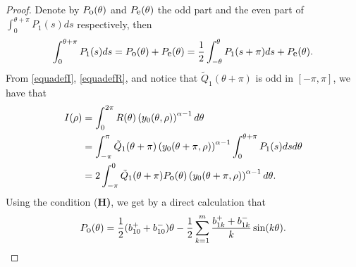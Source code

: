 \documentclass[11pt]{amsart}
\theoremstyle{remark}
\theoremstyle{definition}
\begin{document}
\begin{proof}
Denote by $P_{\mbox{\small{o}}}(\theta)$ and $P_{\mbox{\small{e}}}(\theta)$
  the odd part and the even part  of $\int_{0}^{\theta+\pi}P_1(s)ds$ respectively, then
   \begin{equation*} \int_{0}^{\theta+\pi}P_1(s)ds=P_{\mbox{\small{o}}}(\theta)+P_{\mbox{\small{e}}}(\theta)=\frac{1}{2}\int_{-\theta}^{\theta}P_1(s+\pi)ds+P_{\mbox{\small{e}}}(\theta).\end{equation*}
From \eqref{equadefI},  \eqref{equadefR}, and notice that $\tilde{Q}_1(\theta+\pi)$ is odd in $[-\pi, \pi]$,  we have that
\begin{equation} \label{cor1equa-1}
\begin{split}
I(\rho)&=\int_{0}^{2\pi}R(\theta)\left(y_0(\theta,\rho)\right)^{\alpha-1} d\theta\\
&=\int_{-\pi}^{\pi}\tilde{Q}_1(\theta+\pi)\left(y_0(\theta+\pi,\rho)\right)^{\alpha-1}\int_{0}^{\theta+\pi}P_1(s)ds d\theta\\
&=2\int_{-\pi}^{0}\tilde{Q}_1(\theta+\pi)P_{\mbox{\small{o}}}(\theta)\left(y_0(\theta+\pi,\rho)\right)^{\alpha-1} d\theta.
\end{split}\end{equation}
Using the condition {(\bf{H})}, we get by  a direct  calculation that
\begin{equation} \label{poequa-1}P_{\mbox{\small{o}}}(\theta)=\frac{1}{2}(b_{10}
^++b_{10}^-)\theta-\frac{1}{2}\sum_{k=1}^m\frac{b_{1k}
^++b_{1k}^-}{k}\sin (k\theta).\end{equation}



\end{proof}
\end{document}
